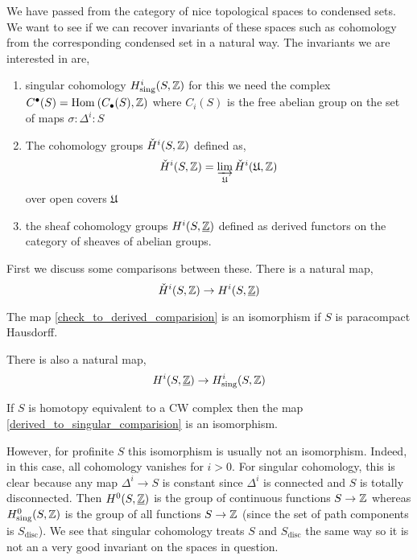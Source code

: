 \documentclass[12pt]{article}
\newcommand{\disc}{\text{disc}}
\newcommand{\sing}{\text{sing}}
\renewcommand{\Cech}{\text{\v{C}ech}\xspace}
\begin{document}
We have passed from the category of nice topological spaces to condensed sets. We want to see if we can recover invariants of these spaces such as cohomology from the corresponding condensed set in a natural way. The invariants we are interested in are,
\begin{enumerate}
\item singular cohomology $H^i_{\sing}(S, \Z)$ for this we need the complex $C^\bullet(S) = \mathrm{Hom}_{} \left( C_\bullet(S), \mathbb{Z} \right)$ where $C_i(S)$ is the free abelian group on the set of maps $\sigma : \Delta^i : S$

\item The \Cech cohomology groups $\check{H}^i(S, \mathbb{Z})$ defined as,
\[ \check{H}^i(S, \mathbb{Z}) = \operatorname*{\varinjlim}_{\mathfrak{U}} \check{H}^i(\mathfrak{U}, \mathbb{Z}) \]
over open covers $\mathfrak{U}$ 

\item the sheaf cohomology groups $H^i(S, \underline{\mathbb{Z}})$ defined as derived functors on the category of sheaves of abelian groups.
\end{enumerate}

First we discuss some comparisons between these. There is a natural map,
\label{check_to_derived_comparision}
\begin{equation}
\check{H}^i(S, \mathbb{Z}) \to H^i(S, \underline{\mathbb{Z}})
\end{equation}

\begin{prop}
The map \ref{check_to_derived_comparision} is an isomorphism if $S$ is paracompact Hausdorff.
\end{prop}

There is also a natural map,
\label{derived_to_singular_comparision}
\begin{equation}
H^i(S, \underline{\Z}) \to H^i_{\sing}(S, \Z)
\end{equation}

\begin{prop}
If $S$ is homotopy equivalent to a CW complex then the map \ref{derived_to_singular_comparision} is an isomorphism.
\end{prop}

However, for profinite $S$ this isomorphism is usually not an isomorphism. Indeed, in this case, all cohomology vanishes for $i > 0$. For singular cohomology, this is clear because any map $\Delta^i \to S$ is constant since $\Delta^i$ is connected and $S$ is totally disconnected. Then $H^0(S, \underline{\mathbb{Z}})$ is the group of continuous functions $S \to \mathbb{Z}$ whereas $H^0_{\sing}(S, \Z)$ is the group of all functions $S \to \mathbb{Z}$ (since the set of path components is $S_{\disc}$). We see that singular cohomology treats $S$ and $S_{\disc}$ the same way so it is not an a very good invariant on the spaces in question.
\end{document}
